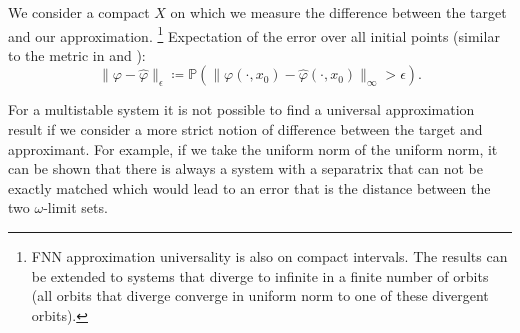 \documentclass{article}
\theoremstyle{definition}
\theoremstyle{remark}
\newcommand{\vol}{\operatorname{vol}}
\newcounter{ct}
\begin{document}
We consider a compact $X$ on which we measure the difference between the target and our approximation.
\footnote{FNN approximation universality is also on compact intervals.
The results can be extended to systems that diverge to infinite in a finite number of orbits (all orbits that diverge converge in uniform norm to one of these divergent orbits).}
%
Expectation of the error over all initial points (similar to the metric in \citep{hammer2000approximation} and \citep{hanson2021learning}):
\begin{equation}
\|\varphi-\hat \varphi\|_\epsilon \coloneqq  \mathbb{P}\left(\|\varphi(\cdot,x_0)-\hat \varphi(\cdot,x_0)\|_\infty>\epsilon\right).
\end{equation}


For a multistable system it is not possible to find a universal approximation result if we consider a more strict notion of difference between the target and approximant.
For example, if we take the uniform norm of the uniform norm, it can be shown that there is always a system with a separatrix that can not be exactly matched which would lead to an error that is the distance between the two $\omega$-limit sets.

\end{document}
